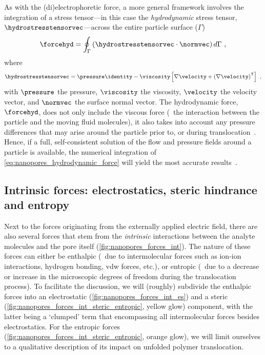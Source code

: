 As with the (di)electrophoretic force, a more general framework involves the integration of a stress
tensor---in this case the \emph{hydrodynamic} stress tensor, $\hydrostresstensorvec$---across the entire
particle surface ($\Gamma$)~\cite{Ghosal-2019}
%
\begin{equation}\label{eq:nanopores_hydrodynamic_force}
  \forcehyd = \oint_{\Gamma} \left( \hydrostresstensorvec \cdot \normvec \right) d\Gamma
  \text{ ,}
\end{equation}
%
where
%
\begin{align}\label{eq:nanopores_hydrodynamic_stresstensor}
  \hydrostresstensorvec =
  \pressure\identity - \viscosity\left[\nabla\velocity + \left(\nabla\velocity \right)^\mathsf{T}\right]
  \text{ ,}
\end{align}
%
with $\pressure$ the pressure, $\viscosity$ the viscosity, $\velocity$ the velocity vector, and $\normvec$ the
surface normal vector. The hydrodynamic force, $\forcehyd$, does not only include the viscous force (\ie~the
interaction between the particle and the moving fluid molecules), it also takes into account any pressure
differences that may arise around the particle prior to, or during
translocation~\cite{Hoogerheide-2014,Wilson-2018}. Hence, if a full, self-consistent solution of the flow and
pressure fields around a particle is available, the numerical integration of
\cref{eq:nanopores_hydrodynamic_force} will yield the most accurate results~\cite{Galla-2014}.



\subsection{Intrinsic forces: electrostatics, steric hindrance and entropy}
%

Next to the forces originating from the externally applied electric field, there are also several forces that
stem from the \emph{intrinsic} interactions between the analyte molecules and the pore itself
(\cref{fig:nanopores_forces_int}). The nature of these forces can either be enthalpic (\ie~due to
intermolecular forces such as ion-ion interactions, hydrogen bonding, \gls{vdw} forces, etc.), or entropic
(\ie~due to a decrease or increase in the microscopic degrees of freedom during the translocation process). To
facilitate the discussion, we will (roughly) subdivide the enthalpic forces into an electrostatic
(\cref{fig:nanopores_forces_int_es}) and a steric (\cref{fig:nanopores_forces_int_steric_entropic}, yellow
glow) component, with the latter being a `clumped' term that encompassing all intermolecular forces besides
electrostatics. For the entropic forces (\cref{fig:nanopores_forces_int_steric_entropic}, orange glow), we
will limit ourselves to a qualitative description of its impact on unfolded polymer translocation.


